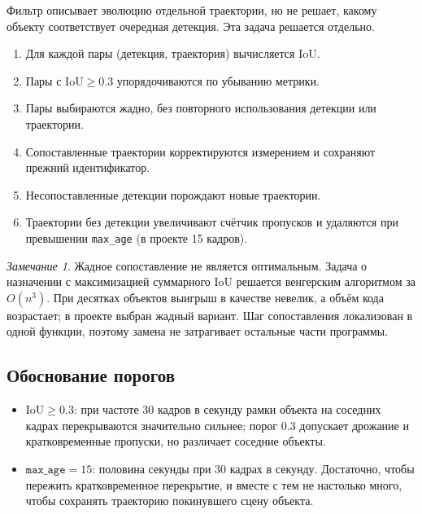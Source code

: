 \documentclass[11pt,a4paper]{article}
\theoremstyle{definition}
\theoremstyle{remark}
\newtheorem*{remark}{Замечание}
\begin{document}
Фильтр описывает эволюцию отдельной траектории, но не решает, какому
объекту соответствует очередная детекция. Эта задача решается отдельно.

\begin{enumerate}
  \item Для каждой пары (детекция, траектория) вычисляется $\mathrm{IoU}$.
  \item Пары с $\mathrm{IoU} \ge 0.3$ упорядочиваются по убыванию метрики.
  \item Пары выбираются жадно, без повторного использования детекции или
        траектории.
  \item Сопоставленные траектории корректируются измерением и сохраняют
        прежний идентификатор.
  \item Несопоставленные детекции порождают новые траектории.
  \item Траектории без детекции увеличивают счётчик пропусков и удаляются при
        превышении \texttt{max\_age} (в проекте 15 кадров).
\end{enumerate}

\begin{remark}
Жадное сопоставление не является оптимальным. Задача о назначении с
максимизацией суммарного $\mathrm{IoU}$ решается венгерским алгоритмом за
$O(n^3)$. При десятках объектов выигрыш в качестве невелик, а объём кода
возрастает; в проекте выбран жадный вариант. Шаг сопоставления локализован в
одной функции, поэтому замена не затрагивает остальные части программы.
\end{remark}

\subsection{Обоснование порогов}

\begin{itemize}
  \item $\mathrm{IoU} \ge 0.3$: при частоте 30 кадров в секунду рамки
        объекта на соседних кадрах перекрываются значительно сильнее;
        порог 0.3 допускает дрожание и кратковременные пропуски, но
        различает соседние объекты.
  \item $\texttt{max\_age} = 15$: половина секунды при 30 кадрах в секунду.
        Достаточно, чтобы пережить кратковременное перекрытие, и вместе с
        тем не настолько много, чтобы сохранять траекторию покинувшего сцену
        объекта.
\end{itemize}

\end{document}
